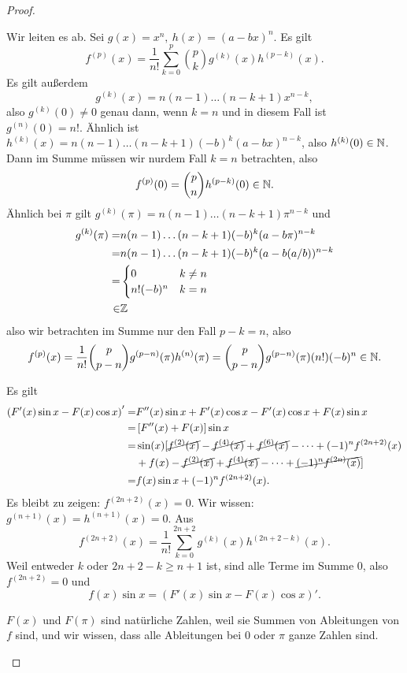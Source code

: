 \begin{proof}
	\begin{parts}
	\item Wir leiten es ab. Sei $g(x)=x^n,~h(x)=(a-bx)^n$. Es gilt
		\[
			f^{(p)}(x)=\frac{1}{n!}\sum_{k=0}^p \binom{p}{k}g^{(k)}(x)h^{(p-k)}(x)
		.\] 
		Es gilt außerdem
		\[
			g^{(k)}(x)=n(n-1)\dots(n-k+1)x^{n-k}
		,\]
		also $g^{(k)}(0)\neq 0$ genau dann, wenn $k=n$ und in diesem Fall ist $g^{(n)}(0)=n!$. Ähnlich ist $h^{(k)}(x)=n(n-1)\dots(n-k+1)(-b)^k(a-bx)^{n-k}$, also $h^{(k)}(0)\in \mathbb{N}$. Dann im Summe müssen wir nurdem Fall $k=n$ betrachten, also
		\[
			f^{(p)}(0)=\binom{p}{n}h^{(p-k)}(0)\in \mathbb{N}
		.\] 
		Ähnlich bei $\pi$ gilt $g^{(k)}(\pi)=n(n-1)\dots (n-k+1)\pi^{n-k}$ und
		\begin{align*}
			g^{(k)}(\pi)=&n(n-1)\dots(n-k+1)(-b)^k(a-b\pi)^{n-k}\\
=&n(n-1)\dots(n-k+1)(-b)^k(a-b(a / b))^{n-k}\\
=&\begin{cases}
	0 & k \neq n\\
	n!(-b)^n & k = n
\end{cases}\\
	\in& \mathbb{Z}
		\end{align*}
		also wir betrachten im Summe nur den Fall $p-k=n$, also
		\[
		f^{(p)}(x)=\frac{1}{n!}\binom{p}{p-n}g^{(p-n)}(\pi)h^{(n)}(\pi)=\binom{p}{p-n}g^{(p-n)}(\pi)(n!)(-b)^n\in \mathbb{N}
		.\] 
	\item Es gilt
		\begin{align*}
			\left( F'(x)\sin x-F(x)\cos x \right)'=& F''(x)\sin x+F'(x)\cos x-F'(x)\cos x+F(x)\sin x\\
			=& \left[ F''(x)+F(x) \right] \sin x\\
			=&\sin(x)[\cancel{f^{(2)}(x)}-\cancel{f^{(4)}(x)}+\cancel{f^{(6)}(x)}-\dots+(-1)^nf^{(2n+2)}(x)\\
			 &+f(x)-\cancel{f^{(2)}(x)}+\cancel{f^{(4)}(x)}-\dots+\cancel{(-1)^n f^{(2n)}(x)}]\\
			=&f(x)\sin x+(-1)^n f^{(2n+2)}(x).
		\end{align*}
		Es bleibt zu zeigen: $f^{(2n+2)}(x)=0$. Wir wissen: $g^{(n+1)}(x)=h^{(n+1)}(x)=0$. Aus
		\[
			f^{(2n+2)}(x)=\frac{1}{n!}\sum_{k=0}^{2n+2} g^{(k)}(x)h^{(2n+2-k)}(x)
		.\] 
		Weil entweder $k$ oder $2n+2-k\ge n+1$ ist, sind alle Terme im Summe $0$, also $f^{(2n+2)}=0$ und
\[
f(x)\sin x=(F'(x)\sin x-F(x)\cos x)'
.\] 
\item $F(x)$ und $F(\pi)$ sind natürliche Zahlen, weil sie Summen von Ableitungen von $f$ sind, und wir wissen, dass alle Ableitungen bei $0$ oder $\pi$ ganze Zahlen sind. 


\end{parts}
\end{proof}
